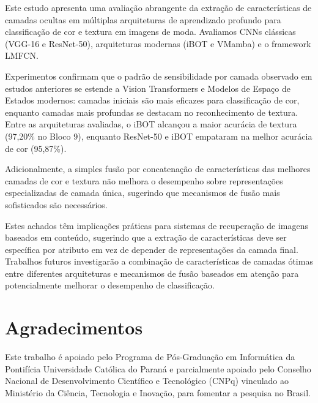 \documentclass[conference]{IEEEtran}
\begin{document}
Este estudo apresenta uma avalia\c{c}\~{a}o abrangente da extra\c{c}\~{a}o de caracter\'{i}sticas de camadas ocultas em m\'{u}ltiplas arquiteturas de aprendizado profundo para classifica\c{c}\~{a}o de cor e textura em imagens de moda. Avaliamos CNNs cl\'{a}ssicas (VGG-16 e ResNet-50), arquiteturas modernas (iBOT e VMamba) e o framework LMFCN.

Experimentos confirmam que o padr\~{a}o de sensibilidade por camada observado em estudos anteriores se estende a Vision Transformers e Modelos de Espa\c{c}o de Estados modernos: camadas iniciais s\~{a}o mais eficazes para classifica\c{c}\~{a}o de cor, enquanto camadas mais profundas se destacam no reconhecimento de textura. Entre as arquiteturas avaliadas, o iBOT alcan\c{c}ou a maior acur\'{a}cia de textura (97,20\% no Bloco 9), enquanto ResNet-50 e iBOT empataram na melhor acur\'{a}cia de cor (95,87\%).

Adicionalmente, a simples fus\~{a}o por concatena\c{c}\~{a}o de caracter\'{i}sticas das melhores camadas de cor e textura n\~{a}o melhora o desempenho sobre representa\c{c}\~{o}es especializadas de camada \'{u}nica, sugerindo que mecanismos de fus\~{a}o mais sofisticados s\~{a}o necess\'{a}rios.

Estes achados t\^{e}m implica\c{c}\~{o}es pr\'{a}ticas para sistemas de recupera\c{c}\~{a}o de imagens baseados em conte\'{u}do, sugerindo que a extra\c{c}\~{a}o de caracter\'{i}sticas deve ser espec\'{i}fica por atributo em vez de depender de representa\c{c}\~{o}es da camada final. Trabalhos futuros investigar\~{a}o a combina\c{c}\~{a}o de caracter\'{i}sticas de camadas \'{o}timas entre diferentes arquiteturas e mecanismos de fus\~{a}o baseados em aten\c{c}\~{a}o para potencialmente melhorar o desempenho de classifica\c{c}\~{a}o.


\section*{Agradecimentos}

Este trabalho \'{e} apoiado pelo Programa de P\'{o}s-Gradua\c{c}\~{a}o em Inform\'{a}tica da Pontif\'{i}cia Universidade Cat\'{o}lica do Paran\'{a} e parcialmente apoiado pelo Conselho Nacional de Desenvolvimento Cient\'{i}fico e Tecnol\'{o}gico (CNPq) vinculado ao Minist\'{e}rio da Ci\^{e}ncia, Tecnologia e Inova\c{c}\~{a}o, para fomentar a pesquisa no Brasil.
\end{document}

